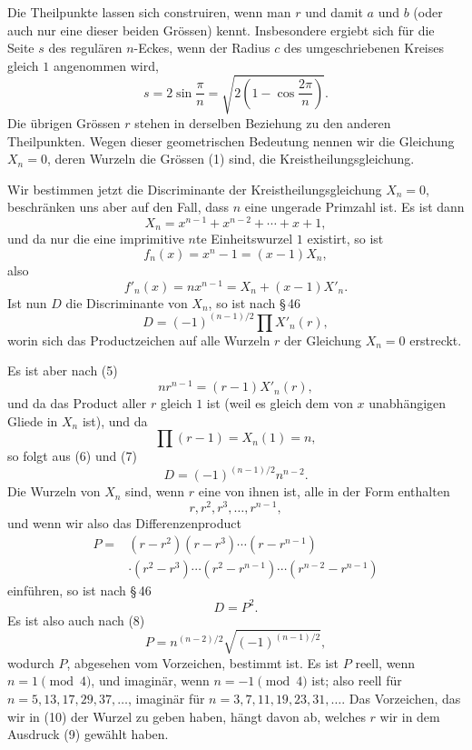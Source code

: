 \documentclass[11pt]{article}
\begin{document}
\begin{figure}[h]
\centering
{}
\par{}
\end{figure}

Die Theilpunkte lassen sich construiren, wenn man $r$ und damit $a$ und $b$ (oder auch nur eine dieser beiden Grössen) kennt. Insbesondere ergiebt sich für die Seite $s$ des regulären $n$-Eckes, wenn der Radius $c$ des umgeschriebenen Kreises gleich $1$ angenommen wird,
\[
        s=2\sin\frac{\pi}{n}=\sqrt{2\left(1-\cos\frac{2\pi}{n}\right)}.
\]
Die übrigen Grössen $r$ stehen in derselben Beziehung zu den anderen Theilpunkten. Wegen dieser geometrischen Bedeutung nennen wir die Gleichung $X_n=0$, deren Wurzeln die Grössen (1) sind, die Kreistheilungsgleichung.

Wir bestimmen jetzt die Discriminante der Kreistheilungsgleichung $X_n=0$, beschränken uns aber auf den Fall, dass $n$ eine ungerade Primzahl ist. Es ist dann
\[
\tag{3}        X_n=x^{n-1}+x^{n-2}+\cdots+x+1,
\]
und da nur die eine imprimitive $n$te Einheitswurzel $1$ existirt, so ist
\[
\tag{4}        f_n(x)=x^n-1=(x-1)X_n,
\]
also
\[
\tag{5}        f'_n(x)=nx^{n-1}=X_n+(x-1)X'_n.
\]
Ist nun $D$ die Discriminante von $X_n$, so ist nach \S\,46
\[
\tag{6}        D=(-1)^{(n-1)/2}\prod X'_n(r),
\]
worin sich das Productzeichen auf alle Wurzeln $r$ der Gleichung $X_n=0$ erstreckt.

Es ist aber nach (5)
\[
\tag{7}        nr^{n-1}=(r-1)X'_n(r),
\]
und da das Product aller $r$ gleich $1$ ist (weil es gleich dem von $x$ unabhängigen Gliede in $X_n$ ist), und da
\[
        \prod(r-1)=X_n(1)=n,
\]
so folgt aus (6) und (7)
\[
\tag{8}        D=(-1)^{(n-1)/2} n^{n-2}.
\]
Die Wurzeln von $X_n$ sind, wenn $r$ eine von ihnen ist, alle in der Form enthalten
\[
        r,r^2,r^3,\ldots,r^{n-1},
\]
und wenn wir also das Differenzenproduct
\[
\tag{9}\begin{aligned}
P={}&(r-r^2)(r-r^3)\cdots(r-r^{n-1})\\
&\cdot(r^2-r^3)\cdots(r^2-r^{n-1})\cdots(r^{n-2}-r^{n-1})
\end{aligned}
\]
einführen, so ist nach \S\,46
\[
        D=P^2.
\]
Es ist also auch nach (8)
\[
\tag{10}       P=n^{(n-2)/2}\sqrt{(-1)^{(n-1)/2}},
\]
wodurch $P$, abgesehen vom Vorzeichen, bestimmt ist. Es ist $P$ reell, wenn $n=1\pmod4$, und imaginär, wenn $n=-1\pmod4$ ist; also reell für $n=5,13,17,29,37,\ldots$, imaginär für $n=3,7,11,19,23,31,\ldots$. Das Vorzeichen, das wir in (10) der Wurzel zu geben haben, hängt davon ab, welches $r$ wir in dem Ausdruck (9) gewählt haben.
\end{document}
